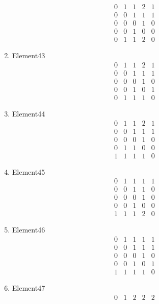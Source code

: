 \documentclass[12pt]{article}
\begin{document}
\begin{multicols}{3}
\begin{enumerate}
\begin{equation*}
\begin{array}{ccccc}
0&1&1&2&1\\
0&0&1&1&1\\
0&0&0&1&0\\
0&0&1&0&0\\
0&1&1&2&0
\end{array}
\end{equation*}
\item Element43
\begin{equation*}
\begin{array}{ccccc}
0&1&1&2&1\\
0&0&1&1&1\\
0&0&0&1&0\\
0&0&1&0&1\\
0&1&1&1&0
\end{array}
\end{equation*}
\item Element44
\begin{equation*}
\begin{array}{ccccc}
0&1&1&2&1\\
0&0&1&1&1\\
0&0&0&1&0\\
0&1&1&0&0\\
1&1&1&1&0
\end{array}
\end{equation*}
\item Element45
\begin{equation*}
\begin{array}{ccccc}
0&1&1&1&1\\
0&0&1&1&0\\
0&0&0&1&0\\
0&0&1&0&0\\
1&1&1&2&0
\end{array}
\end{equation*}
\item Element46
\begin{equation*}
\begin{array}{ccccc}
0&1&1&1&1\\
0&0&1&1&1\\
0&0&0&1&0\\
0&0&1&0&1\\
1&1&1&1&0
\end{array}
\end{equation*}
\item Element47
\begin{equation*}
\begin{array}{ccccc}
0&1&2&2&2\\

\end{array}
\end{equation*}
\end{enumerate}
\end{multicols}
\end{document}
